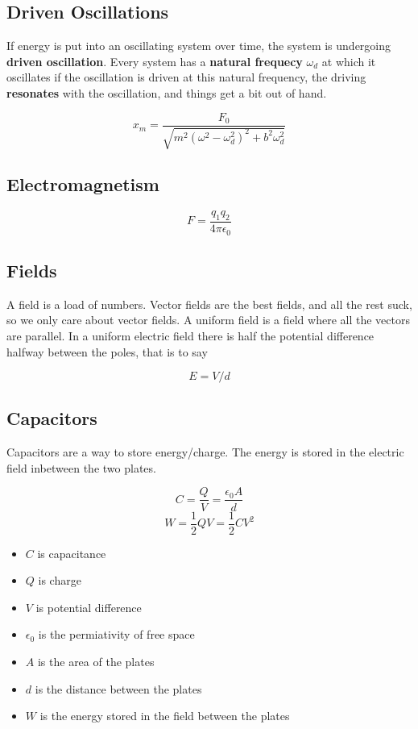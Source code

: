 \documentclass{article}
\begin{document}
\subsection{Driven Oscillations}
If energy is put into an oscillating system over time, the system is undergoing \textbf{driven oscillation}. Every system has a \textbf{natural frequecy} $\omega_d$ at which it oscillates if the oscillation is driven at this natural frequency, the driving \textbf{resonates} with the oscillation, and things get a bit out of hand.

\[x_m=\frac{F_0}{\sqrt{m^2\left(\omega^2-\omega_d^2\right)^2+b^2\omega_d^2}}\]

\subsection{Electromagnetism}

\[F=\frac{q_1q_2}{4\pi\epsilon_0}\]

\subsection{Fields}

A field is a load of numbers. Vector fields are the best fields, and all the rest suck, so we only care about vector fields. A uniform field is a field where all the vectors are parallel. In a uniform electric field there is half the potential difference halfway between the poles, that is to say

\[E=V/d\]

\subsection{Capacitors}


Capacitors are a way to store energy/charge. The energy is stored in the electric field inbetween the two plates.

\[C=\frac{Q}{V}=\frac{\epsilon_0A}{d}\]
\[W=\frac{1}{2}QV=\frac{1}{2}CV^2\]

\begin{itemize}
	\item $C$ is capacitance
	\item $Q$ is charge
	\item $V$ is potential difference
	\item $\epsilon_0$ is the permiativity of free space
	\item $A$ is the area of the plates
	\item $d$ is the distance between the plates
	\item $W$ is the energy stored in the field between the plates
\end{itemize}
\end{document}
